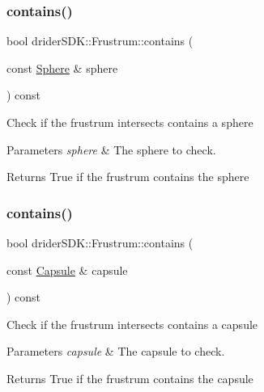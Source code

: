 \subsubsection{\texorpdfstring{contains()}{contains()}\hspace{0.1cm}{\footnotesize\ttfamily [3/5]}}
{\footnotesize\ttfamily bool drider\+S\+D\+K\+::\+Frustrum\+::contains (\begin{DoxyParamCaption}\item[{const \hyperlink{classdrider_s_d_k_1_1_sphere}{Sphere} \&}]{sphere }\end{DoxyParamCaption}) const}

Check if the frustrum intersects contains a sphere


\begin{DoxyParams}{Parameters}
{\em sphere} & The sphere to check.\\
\hline
\end{DoxyParams}
\begin{DoxyReturn}{Returns}
True if the frustrum contains the sphere 
\end{DoxyReturn}
\mbox{\label{classdrider_s_d_k_1_1_frustrum_adea6a6bbf8c644411daa82fd3828bae5}} 
\subsubsection{\texorpdfstring{contains()}{contains()}\hspace{0.1cm}{\footnotesize\ttfamily [4/5]}}
{\footnotesize\ttfamily bool drider\+S\+D\+K\+::\+Frustrum\+::contains (\begin{DoxyParamCaption}\item[{const \hyperlink{classdrider_s_d_k_1_1_capsule}{Capsule} \&}]{capsule }\end{DoxyParamCaption}) const}

Check if the frustrum intersects contains a capsule


\begin{DoxyParams}{Parameters}
{\em capsule} & The capsule to check.\\
\hline
\end{DoxyParams}
\begin{DoxyReturn}{Returns}
True if the frustrum contains the capsule 
\end{DoxyReturn}
\mbox{\label{classdrider_s_d_k_1_1_frustrum_aa0d6748145ce571b0bffdee5d799c091}} 
